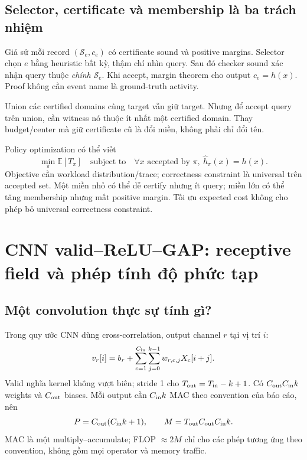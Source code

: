 \documentclass[11pt,a4paper]{article}
\newcommand{\E}{\mathbb E}
\newcommand{\Sset}{\mathcal S}
\theoremstyle{definition}
\begin{document}
\subsection{Selector, certificate và membership là ba trách nhiệm}
Giả sử mỗi record $(\Sset_e,c_e)$ có certificate sound và positive margins.
Selector chọn $e$ bằng heuristic bất kỳ, thậm chí nhìn query. Sau đó checker
sound xác nhận query thuộc \emph{chính} $\Sset_e$. Khi accept, margin theorem
cho output $c_e=h(x)$. Proof không cần event name là ground-truth activity.

Union các certified domains cùng target vẫn giữ target. Nhưng để accept
query trên union, cần witness nó thuộc ít nhất một certified domain. Thay
budget/center mà giữ certificate cũ là đổi miền, không phải chỉ đổi tên.

Policy optimization có thể viết
\begin{equation}
\min_\pi\E[T_\pi]\quad\text{subject to}\quad
\forall x\text{ accepted by }\pi,\ \widehat h_\pi(x)=h(x).
\end{equation}
Objective cần workload distribution/trace; correctness constraint là
universal trên accepted set. Một miền nhỏ có thể dễ certify nhưng ít query;
miền lớn có thể tăng membership nhưng mất positive margin. Tối ưu expected
cost không cho phép bỏ universal correctness constraint.

\section{CNN valid--ReLU--GAP: receptive field và phép tính độ phức tạp}
\subsection{Một convolution thực sự tính gì?}
Trong quy ước CNN dùng cross-correlation, output channel $r$ tại vị trí $i$:
\begin{equation}
v_r[i]=b_r+\sum_{c=1}^{C_{\rm in}}\sum_{j=0}^{k-1}w_{r,c,j}X_c[i+j].
\end{equation}
Valid nghĩa kernel không vượt biên; stride 1 cho $T_{\rm out}=T_{\rm in}-k+1$.
Có $C_{\rm out}C_{\rm in}k$ weights và $C_{\rm out}$ biases.
Mỗi output cần $C_{\rm in}k$ MAC theo convention của báo cáo, nên
\begin{equation}
P=C_{\rm out}(C_{\rm in}k+1),\qquad
M=T_{\rm out}C_{\rm out}C_{\rm in}k.
\end{equation}
MAC là một multiply--accumulate; FLOP $\approx2M$ chỉ cho các phép tương
ứng theo convention, không gồm mọi operator và memory traffic.
\end{document}
